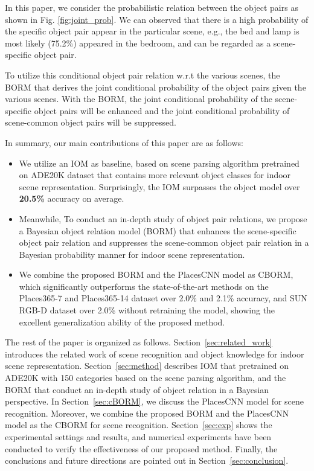 \documentclass[letterpaper, 10 pt, conference]{ieeeconf}  %
\begin{document}
In this paper, we consider the probabilistic relation between the object pairs as shown in Fig. \ref{fig:joint_prob}. We can observed that there is a high probability of the specific object pair appear in the particular scene, e.g., the bed and lamp is most likely (75.2\%) appeared in the bedroom, and can be regarded as a scene-specific object pair. 

To utilize this conditional object pair relation w.r.t the various scenes, the BORM that derives the joint conditional probability of the object pairs given the various scenes. With the BORM, the joint conditional probability of the scene-specific object pairs will be enhanced and the joint conditional probability of scene-common object pairs will be suppressed. 


In summary, our main contributions of this paper are as follows:

\begin{itemize}
	\item We utilize an IOM as baseline, based on scene parsing algorithm pretrained on ADE20K dataset that contains more relevant object classes for indoor scene representation. Surprisingly, the IOM surpasses the object model over \textbf{20.5\%} accuracy on average. 
	
	\item Meanwhile, To conduct an in-depth study of object pair relations, we propose a Bayesian object relation model (BORM) that enhances the scene-specific object pair relation and suppresses the scene-common object pair relation in a Bayesian probability manner for indoor scene representation.
	
	\item We combine the proposed BORM and the PlacesCNN model as CBORM, which significantly outperforms the state-of-the-art methods on the Places365-7 and Places365-14 dataset over 2.0\% and 2.1\% accuracy, and SUN RGB-D dataset over 2.0\% without retraining the model, showing the excellent generalization ability of the proposed method.

	
\end{itemize}

The rest of the paper is organized as follows. Section~\ref{sec:related_work} introduces the related work of scene recognition and object knowledge for indoor scene representation. Section~\ref{sec:method} describes IOM that pretrained on ADE20K with 150 categories based on the scene parsing algorithm, and the BORM that conduct an in-depth study of object relation in a Bayesian perspective. In Section~\ref{sec:cBORM}, we discuss the PlacesCNN model for scene recognition. Moreover, we combine the proposed BORM and the PlacesCNN model as the CBORM for scene recognition.  Section~\ref{sec:exp} shows the experimental settings and results, and numerical experiments have been conducted to verify the effectiveness of our proposed method. Finally, the conclusions and future directions are pointed out in Section~\ref{sec:conclusion}.
\end{document}
